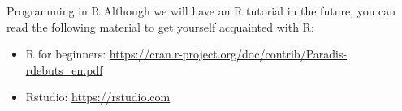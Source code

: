\documentclass[aspectratio=169]{beamer}
\begin{document}
\begin{CJK}{UTF8}{ipxm}
\begin{frame}{Programming in R}
  Although we will have an R tutorial in the future, you can read the
  following material to get yourself acquainted with R:\bigskip

  \begin{itemize}
    \item R for beginners: \url{https://cran.r-project.org/doc/contrib/Paradis-rdebuts_en.pdf}
    \item Rstudio: \url{https://rstudio.com}
  \end{itemize}
\end{frame}


\end{CJK}
\end{document}
